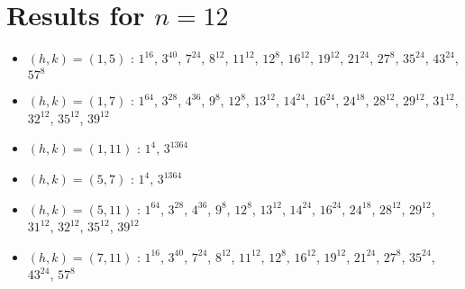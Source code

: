 \section{Results for $n=12$}
\begin{itemize}
\item $(h,k)=(1,5)$ : $1^{16}$, $3^{40}$, $7^{24}$, $8^{12}$, $11^{12}$, $12^{8}$, $16^{12}$, $19^{12}$, $21^{24}$, $27^{8}$, $35^{24}$, $43^{24}$, $57^{8}$
\item $(h,k)=(1,7)$ : $1^{64}$, $3^{28}$, $4^{36}$, $9^{8}$, $12^{8}$, $13^{12}$, $14^{24}$, $16^{24}$, $24^{18}$, $28^{12}$, $29^{12}$, $31^{12}$, $32^{12}$, $35^{12}$, $39^{12}$
\item $(h,k)=(1,11)$ : $1^{4}$, $3^{1364}$
\item $(h,k)=(5,7)$ : $1^{4}$, $3^{1364}$
\item $(h,k)=(5,11)$ : $1^{64}$, $3^{28}$, $4^{36}$, $9^{8}$, $12^{8}$, $13^{12}$, $14^{24}$, $16^{24}$, $24^{18}$, $28^{12}$, $29^{12}$, $31^{12}$, $32^{12}$, $35^{12}$, $39^{12}$
\item $(h,k)=(7,11)$ : $1^{16}$, $3^{40}$, $7^{24}$, $8^{12}$, $11^{12}$, $12^{8}$, $16^{12}$, $19^{12}$, $21^{24}$, $27^{8}$, $35^{24}$, $43^{24}$, $57^{8}$
\end{itemize}
